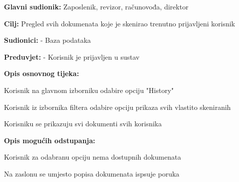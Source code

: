 					\noindent {}
						\begin{packed_item}
		
							\item \textbf{Glavni sudionik:} Zaposlenik, revizor, računovođa, direktor
							\item  \textbf{Cilj:} Pregled svih dokumenata koje je skenirao trenutno prijavljeni korisnik
							\item  \textbf{Sudionici:} - Baza podataka
							\item  \textbf{Preduvjet:} - Korisnik je prijavljen u sustav
							\item  \textbf{Opis osnovnog tijeka:}
							
							\item[] \begin{packed_enum}
								\item Korisnik na glavnom izborniku odabire opciju "History"
								\item Korisnik iz izbornika filtera odabire opciju prikaza svih vlastito skeniranih
								\item Korisniku se prikazuju svi dokumenti svih korisnika
							\end{packed_enum}
							
							\item  \textbf{Opis mogućih odstupanja:}
							
							\item[] \begin{packed_item}
		
								\item[3.a]Korisnik za odabranu opciju nema dostupnih dokumenata
								\item[] \begin{packed_enum}
									\item Na zaslonu se umjesto popisa dokumenata ispsuje poruka
								\end{packed_enum}
							\end{packed_item}
						\end{packed_item}

